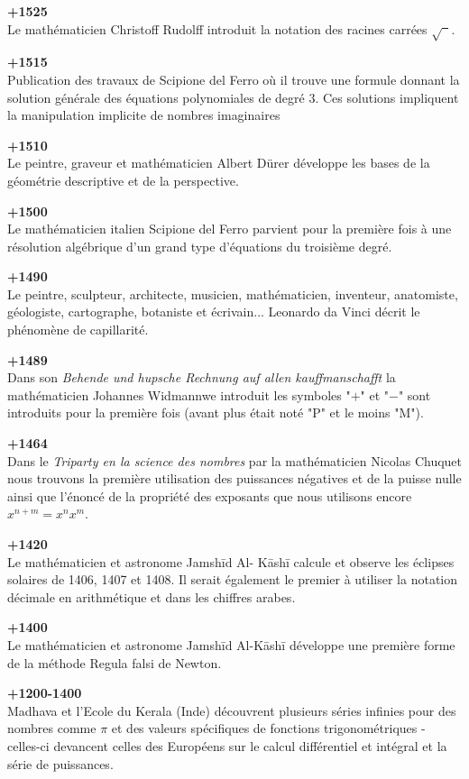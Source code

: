\textbf{+1525}\\
Le mathématicien Christoff Rudolff introduit la notation des racines carrées $\sqrt{\phantom{a}}$.

\textbf{+1515}\\
Publication des travaux de Scipione del Ferro où il trouve une formule donnant la solution générale des équations polynomiales de degré $ 3 $. Ces solutions impliquent la manipulation implicite de nombres imaginaires

\textbf{+1510}\\
Le peintre, graveur et mathématicien Albert Dürer développe les bases de la géométrie descriptive et de la perspective.

\textbf{+1500}\\
Le mathématicien italien Scipione del Ferro parvient pour la première fois à une résolution algébrique d'un grand type d'équations du troisième degré.

\textbf{+1490}\\
Le peintre, sculpteur, architecte, musicien, mathématicien, inventeur, anatomiste, géologiste, cartographe, botaniste et écrivain... Leonardo da Vinci décrit le phénomène de capillarité.

\textbf{+1489}\\
Dans son \textit{Behende und hupsche Rechnung auf allen kauffmanschafft} la mathématicien Johannes Widmannwe introduit les symboles "$ + $" et "$ - $" sont introduits pour la première fois (avant plus était noté "P" et le moins "M").

\textbf{+1464}\\
Dans le \textit{Triparty en la science des nombres} par la mathématicien Nicolas Chuquet nous trouvons la première utilisation des puissances négatives et de la puisse nulle ainsi que l'énoncé de la propriété des exposants que nous utilisons encore $x^{n + m} = x^n x^m$.

\textbf{+1420}\\
Le mathématicien et astronome Jamshīd Al- Kāshī calcule et observe les éclipses solaires de 1406, 1407 et 1408. Il serait également le premier à utiliser la notation décimale en arithmétique et dans les chiffres arabes.

\textbf{+1400}\\
Le mathématicien et astronome Jamshīd Al-Kāshī développe une première forme de la méthode Regula falsi de Newton.

\textbf{+1200-1400}\\
Madhava et l'Ecole du Kerala (Inde) découvrent plusieurs séries infinies pour des nombres comme $\pi$ et des valeurs spécifiques de fonctions trigonométriques - celles-ci devancent celles des Européens sur le calcul différentiel et intégral et la série de puissances.


